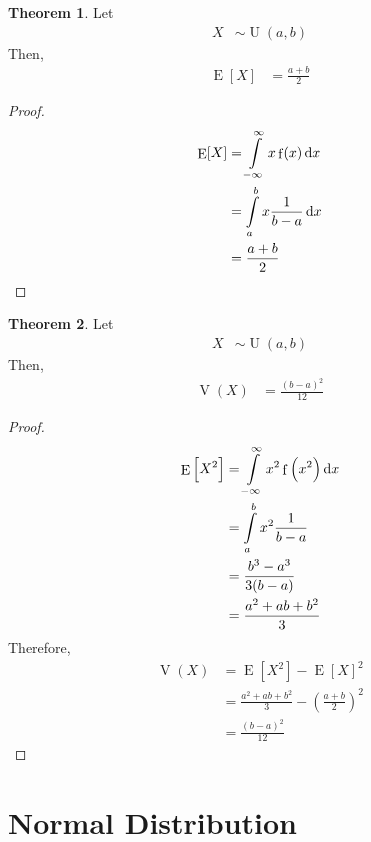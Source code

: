 \documentclass[titlepage, fleqn, a4paper, 12pt, twoside]{article}
\theoremstyle{definition}
\theoremstyle{theorem}
\newtheorem{theorem}{Theorem}
\DeclareMathOperator{\expct}{\mathrm{E}}
\DeclareMathOperator{\var}{\mathrm{V}}
\DeclareMathOperator{\pdf}{\mathrm{f}}
\DeclareMathOperator{\uniform}{\mathrm{U}}
\begin{document}
\begin{theorem}
	Let
	\begin{align*}
		X &\sim \uniform(a,b)
	\end{align*}
	Then,
	\begin{align*}
		\expct[X] &= \frac{a + b}{2}
	\end{align*}
\end{theorem}

\begin{proof}
	\begin{align*}
		\expct[X] &= \int\limits_{-\infty}^{\infty} x \pdf(x) \dif x\\
		&= \int\limits_{a}^{b} x \frac{1}{b - a} \dif x\\
		&= \frac{a + b}{2}
	\end{align*}
\end{proof}

\begin{theorem}
	Let
	\begin{align*}
		X &\sim \uniform(a,b)
	\end{align*}
	Then,
	\begin{align*}
		\var(X) &= \frac{(b - a)^2}{12}
	\end{align*}
\end{theorem}

\begin{proof}
	\begin{align*}
		\expct\left[ X^2 \right] &= \int\limits_{-\infty}^{\infty} x^2 \pdf\left( x^2 \right) \dif x\\
		&= \int\limits_{a}^{b} x^2 \frac{1}{b - a}\\
		&= \frac{b^3 - a^3}{3 (b - a)}\\
		&= \frac{a^2 + a b + b^2}{3}
	\end{align*}
	Therefore,
	\begin{align*}
		\var(X) &= \expct\left[ X^2 \right] - \expct[X]^2\\
		&= \frac{a^2 + a b + b^2}{3} - \left( \frac{a + b}{2} \right)^2\\
		&= \frac{(b - a)^2}{12}
	\end{align*}
\end{proof}

\section{Normal Distribution}
\end{document}
